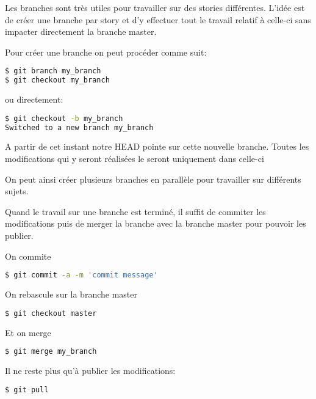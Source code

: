 \documentclass[10pt,a4paper]{report}
\begin{document}
Les branches sont tr\`es utiles pour travailler sur des stories diff\'erentes. L'id\'ee est de cr\'eer une branche par story et d'y effectuer tout le travail relatif \`a celle-ci sans impacter directement la branche master. 

\noindent Pour cr\'eer une branche on peut proc\'eder comme suit:
\begin{lstlisting}[language=bash]
$ git branch my_branch
$ git checkout my_branch
\end{lstlisting}

\noindent ou directement:
\begin{lstlisting}[language=bash]
$ git checkout -b my_branch
Switched to a new branch my_branch
\end{lstlisting}

A partir de cet instant notre HEAD pointe sur cette nouvelle branche. Toutes les modifications qui y seront r\'ealis\'ees le seront uniquement dans celle-ci

On peut ainsi cr\'eer plusieurs branches en parall\`ele pour travailler sur diff\'erents sujets.

Quand le travail sur une branche est termin\'e, il suffit de commiter les modifications puis de merger la branche avec la branche master pour pouvoir les publier.

\noindent On commite
\begin{lstlisting}[language=bash]
$ git commit -a -m 'commit message'
\end{lstlisting}

\noindent On rebascule sur la branche master
\begin{lstlisting}[language=bash]
$ git checkout master
\end{lstlisting}

\noindent Et on merge
\begin{lstlisting}[language=bash]
$ git merge my_branch
\end{lstlisting}

\noindent Il ne reste plus qu'\`a publier les modifications:
\begin{lstlisting}[language=bash]
$ git pull
\end{lstlisting}

\printindex
\end{document}
